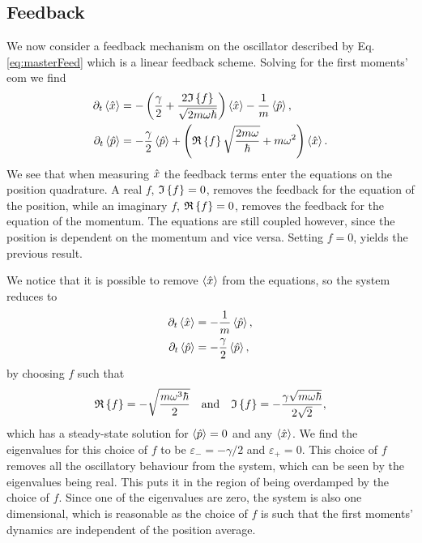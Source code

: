 \subsection{Feedback}
We now consider a feedback mechanism on the oscillator described by Eq. \eqref{eq:masterFeed} which is a linear feedback scheme. Solving for the first moments' \gls{eom} we find 
\begin{align}
    \partial_t\expval{\hat{x}} &= - \left(\frac{\gamma}{2} + \frac{2 \mathfrak{I}\left\{f\right\}}{\sqrt{2 m \omega \hbar}} \right)\expval{\hat{x}} - \frac{1}{m} \expval{\hat{p}},\\
    \partial_t\expval{\hat{p}} &= -\frac{\gamma}{2}\expval{\hat{p}} + \left(\mathfrak{R}\left\{f\right\} \sqrt{\frac{2 m \omega}{\hbar}} + m \omega^2 \right) \expval{\hat{x}}.
\end{align}
We see that when measuring $\hat{x}$ the feedback terms enter the equations on the position quadrature. A real $f$, $\mathfrak{I}\left\{f\right\} = 0$, removes the feedback for the equation of the position, while an imaginary $f$, $\mathfrak{R}\left\{f\right\} = 0$, removes the feedback for the equation of the momentum. The equations are still coupled however, since the position is dependent on the momentum and vice versa. Setting $f = 0$, yields the previous result.

We notice that it is possible to remove $\expval{\hat{x}}$ from the equations, so the system reduces to 
\begin{align}
    \partial_t\expval{\hat{x}} &= - \frac{1}{m} \expval{\hat{p}},\\
    \partial_t\expval{\hat{p}} &= -\frac{\gamma}{2} \expval{\hat{p}},
\end{align}
by choosing $f$ such that
\begin{equation}
    \mathfrak{R}\left\{f\right\} = - \sqrt{\frac{m \omega^3 \hbar}{2}} \quad \text{and} \quad \mathfrak{I}\left\{f\right\} = -\frac{\gamma\sqrt{m\omega\hbar}}{2\sqrt{2}} \label{eq:reFimF_toZero},
\end{equation}
which has a steady-state solution for $\expval{\hat{p}} = 0$ and any $\expval{\hat{x}}$. We find the eigenvalues for this choice of $f$ to be $\varepsilon_- = -\gamma /2$ and $\varepsilon_+ = 0$. This choice of $f$ removes all the oscillatory behaviour from the system, which can be seen by the eigenvalues being real. This puts it in the region of being overdamped by the choice of $f$. Since one of the eigenvalues are zero, the system is also  one dimensional, which is reasonable as the choice of $f$ is such that the first moments' dynamics are independent of the position average.

